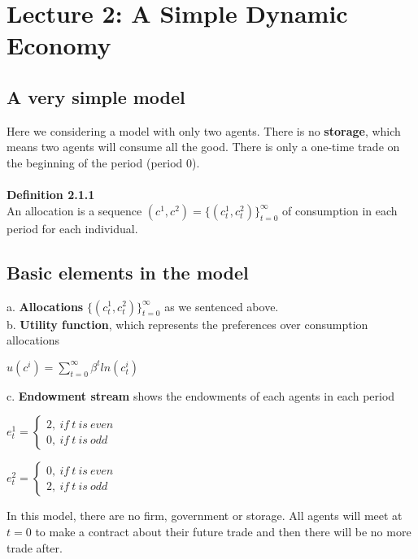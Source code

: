 \documentclass{article}
\begin{document}
\newpage
\section{Lecture 2: A Simple Dynamic Economy}%


\subsection{A very simple model}
Here we considering a model with only two agents. There is no \textbf{storage}, which means two agents will consume all the good. There is only a one-time trade on the beginning of the period (period 0).\\\\
\textbf{Definition 2.1.1}\\
An allocation is a sequence $(c^1, c^2) = \{(c^1_t, c^2_t)\}^\infty_{t=0}$ of consumption in each period for each individual.


\subsection{Basic elements in the model}
a. \textbf{Allocations} $\{(c^1_t, c^2_t)\}^\infty_{t=0}$ as we sentenced above.\\
b. \textbf{Utility function}, which represents the preferences over consumption allocations\\
\centerline{$u(c^i) = \sum\limits^\infty_{t=0} \beta^t ln(c^i_t)$}
c. \textbf{Endowment stream} shows the endowments of each agents in each period\\
\centerline{$e^1_t = \left\{
		 					\begin{array}{lr}
								2,\ if\ t\ is\ even\\
								0,\ if\ t\ is\ odd
		 					\end{array}
		 			  \right.$
		 		}
\centerline{$e^2_t = \left\{
		 					\begin{array}{lr}
								0,\ if\ t\ is\ even\\
								2,\ if\ t\ is\ odd
		 					\end{array}
		 			  \right.$
		 		}		 		
In this model, there are no firm, government or storage. All agents will meet at $t = 0$ to make a contract about their future trade and then there will be no more trade after.
\end{document}
